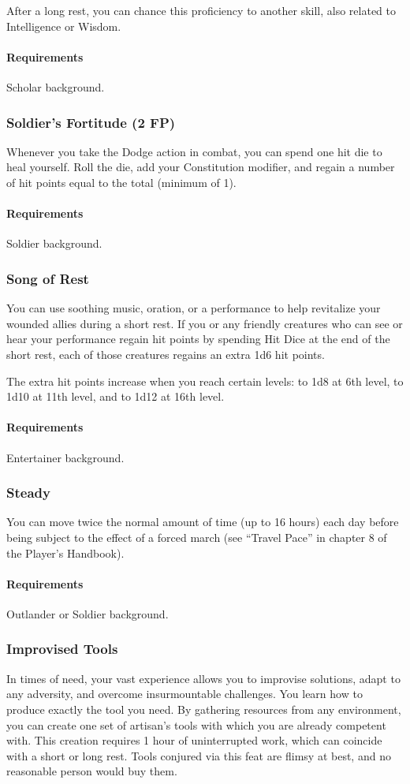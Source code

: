     After a long rest, you can chance this proficiency to another skill, also related to Intelligence or Wisdom.
    \paragraph{Requirements} Scholar background.
\subsubsection{Soldier's Fortitude (2 FP)} \label{feat::soldiersfortitude}
    Whenever you take the Dodge action in combat, you can spend one hit die to heal yourself.
    Roll the die, add your Constitution modifier, and regain a number of hit points equal to the total (minimum of 1).
    \paragraph{Requirements} Soldier background.
\subsubsection{Song of Rest} \label{feat::songofrest}
    You can use soothing music, oration, or a performance to help revitalize your wounded allies during a short rest.
    If you or any friendly creatures who can see or hear your performance regain hit points by spending Hit Dice at the end of the short rest, each of those creatures regains an extra 1d6 hit points.

    The extra hit points increase when you reach certain levels: to 1d8 at 6th level, to 1d10 at 11th level, and to 1d12 at 16th level.
    \paragraph{Requirements} Entertainer background.
\subsubsection{Steady} \label{feat::steady}
    You can move twice the normal amount of time (up to 16 hours) each day before being subject to the effect of a forced march (see ``Travel Pace'' in chapter 8 of the Player's Handbook).
    \paragraph{Requirements} Outlander or Soldier background.
\subsubsection{Improvised Tools} \label{feat::improvisedtools}
    In times of need, your vast experience allows you to improvise solutions, adapt to any adversity, and overcome insurmountable challenges.
    You learn how to produce exactly the tool you need.
    By gathering resources from any environment, you can create one set of artisan's tools with which you are already competent with.
    This creation requires 1 hour of uninterrupted work, which can coincide with a short or long rest.
    Tools conjured via this feat are flimsy at best, and no reasonable person would buy them.
